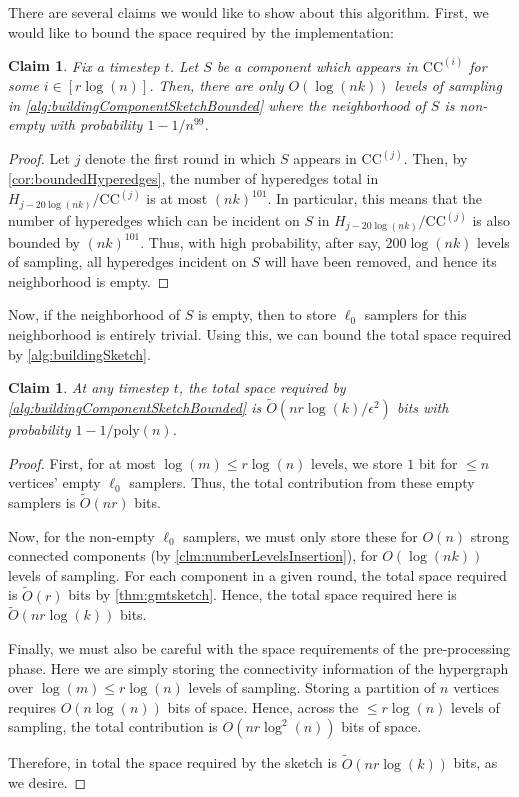 \documentclass[11pt]{article}
\newtheorem{claim}[theorem]{Claim}
\theoremstyle{definition}
\newcommand{\eps}{\epsilon}
\begin{document}
There are several claims we would like to show about this algorithm. First, we would like to bound the space required by the implementation:

\begin{claim}\label{clm:numberLevelsBounded}
	Fix a timestep $t$. Let $S$ be a component which appears in $\mathrm{CC}^{(i)}$ for some $i \in [r \log(n)]$. Then, there are only $O(\log(nk))$ levels of sampling in \cref{alg:buildingComponentSketchBounded} where the neighborhood of $S$ is non-empty with probability $1 - 1 / n^{99}$.
\end{claim}

\begin{proof}
	Let $j$ denote the first round in which $S$ appears in $\mathrm{CC}^{(j)}$. Then, by \cref{cor:boundedHyperedges}, the number of hyperedges total in $H_{j - 20 \log(nk)} / \mathrm{CC}^{(j)}$ is at most $(nk)^{101}$. In particular, this means that the number of hyperedges which can be incident on $S$ in $H_{j - 20 \log(nk)} / \mathrm{CC}^{(j)}$ is also bounded by $(nk)^{101}$. Thus, with high probability, after say, $200 \log(nk)$ levels of sampling, all hyperedges incident on $S$ will have been removed, and hence its neighborhood is empty.
\end{proof}

Now, if the neighborhood of $S$ is empty, then to store $\ell_0$ samplers for this neighborhood is entirely trivial. Using this, we can bound the total space required by \cref{alg:buildingSketch}.

\begin{claim}\label{clm:sketchComponentsSpaceBounded}
	At any timestep $t$, the total space required by \cref{alg:buildingComponentSketchBounded} is $\widetilde{O}(nr \log(k) / \eps^2)$ bits with probability $1 - 1 / \mathrm{poly}(n)$.
\end{claim}

\begin{proof}
	First, for at most $\log(m) \leq r \log(n)$ levels, we store $1$ bit for $\leq n$ vertices' empty $\ell_0$ samplers. Thus, the total contribution from these empty samplers is $\widetilde{O}(nr)$ bits. 
	
	Now, for the non-empty $\ell_0$ samplers, we must only store these for $O(n)$ strong connected components (by \cref{clm:numberLevelsInsertion}), for $O(\log(nk))$ levels of sampling. For each component in a given round, the total space required is $\widetilde{O}(r)$ bits by \cref{thm:gmtsketch}. Hence, the total space required here is $\widetilde{O}(nr \log(k))$ bits. 
	
	Finally, we must also be careful with the space requirements of the pre-processing phase. Here we are simply storing the connectivity information of the hypergraph over $\log(m) \leq r \log(n)$ levels of sampling. Storing a partition of $n$ vertices requires $O(n \log(n))$ bits of space. Hence, across the $\leq r \log(n)$ levels of sampling, the total contribution is $O(nr \log^2(n))$ bits of space.
	
	Therefore, in total the space required by the sketch is $\widetilde{O}(nr \log(k))$ bits, as we desire. 
\end{proof}
\end{document}
